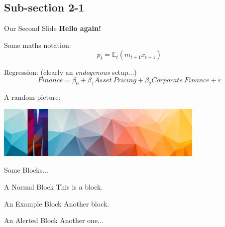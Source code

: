 \documentclass[aspectratio=149]{beamer}
\begin{document}
\subsection{Sub-section 2-1}
\begin{frame}{Our Second Slide}
  \textbf{Hello again!}

  \hrulefill

  Some maths notation:
  $$ p_t=\mathbb{E}_t(m_{t+1}x_{t+1}) $$

  \hrulefill

  Regression: (clearly an \emph{endogenous} setup...)
  $$ Finance = \beta_0 + \beta_1Asset\ Pricing + \beta_2Corporate\
    Finance + \varepsilon $$

  \hrulefill

  A random picture:

  \medskip

  \centering\includegraphics[width=10cm]{figures/monash-banner.jpg}
\end{frame}

\begin{frame}{Some Blocks...}
  \begin{block}{A Normal Block}
    This is a block.
  \end{block}

  \begin{exampleblock}{An Example Block}
    Another block.
  \end{exampleblock}

  \begin{alertblock}{An Alerted Block}
    Another one...
  \end{alertblock}
\end{frame}
\end{document}
